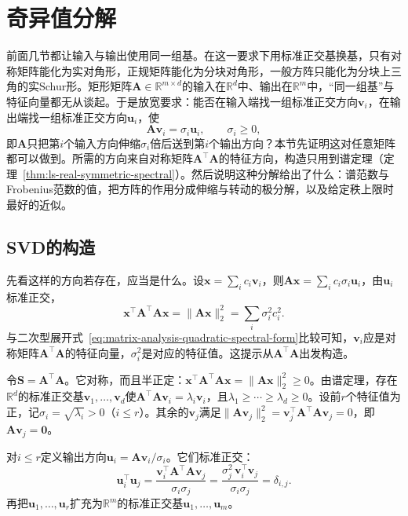 
\section{奇异值分解}
\label{sec:ls-svd}

前面几节都让输入与输出使用同一组基。在这一要求下用标准正交基换基，只有对称矩阵能化为实对角形，正规矩阵能化为分块对角形，一般方阵只能化为分块上三角的实Schur形。矩形矩阵$\bm A\in\mathbb R^{m\times d}$的输入在$\mathbb R^d$中、输出在$\mathbb R^m$中，“同一组基”与特征向量都无从谈起。于是放宽要求：能否在输入端找一组标准正交方向$\bm v_i$，在输出端找一组标准正交方向$\bm u_i$，使
\[
 \bm A\bm v_i=\sigma_i\bm u_i ,\qquad \sigma_i\geq0,
\]
即$\bm A$只把第$i$个输入方向伸缩$\sigma_i$倍后送到第$i$个输出方向？本节先证明这对任意矩阵都可以做到。所需的方向来自对称矩阵$\bm A^\top\bm A$的特征方向，构造只用到谱定理（定理~\ref{thm:ls-real-symmetric-spectral}）。然后说明这种分解给出了什么：谱范数与Frobenius范数的值，把方阵的作用分成伸缩与转动的极分解，以及给定秩上限时最好的近似。

\subsection{SVD的构造}

先看这样的方向若存在，应当是什么。设$\bm x=\sum_ic_i\bm v_i$，则$\bm A\bm x=\sum_ic_i\sigma_i\bm u_i$，由$\bm u_i$标准正交，
\[
 \bm x^\top\bm A^\top\bm A\bm x=\lVert\bm A\bm x\rVert_2^2=\sum_i\sigma_i^2c_i^2 .
\]
与二次型展开式~\eqref{eq:matrix-analysis-quadratic-spectral-form}比较可知，$\bm v_i$应是对称矩阵$\bm A^\top\bm A$的特征向量，$\sigma_i^2$是对应的特征值。这提示从$\bm A^\top\bm A$出发构造。

令$\bm S=\bm A^\top\bm A$。它对称，而且半正定：$\bm x^\top\bm A^\top\bm A\bm x=\lVert\bm A\bm x\rVert_2^2\geq0$。由谱定理，存在$\mathbb R^d$的标准正交基$\bm v_1,\ldots,\bm v_d$使$\bm A^\top\bm A\bm v_i=\lambda_i\bm v_i$，且$\lambda_1\geq\cdots\geq\lambda_d\geq0$。设前$r$个特征值为正，记$\sigma_i=\sqrt{\lambda_i}>0$（$i\leq r$）。其余的$\bm v_j$满足$\lVert\bm A\bm v_j\rVert_2^2=\bm v_j^\top\bm A^\top\bm A\bm v_j=0$，即$\bm A\bm v_j=\bm0$。

对$i\leq r$定义输出方向$\bm u_i=\bm A\bm v_i/\sigma_i$。它们标准正交：
\[
 \bm u_i^\top\bm u_j
 =\frac{\bm v_i^\top\bm A^\top\bm A\bm v_j}{\sigma_i\sigma_j}
 =\frac{\sigma_j^2\,\bm v_i^\top\bm v_j}{\sigma_i\sigma_j}=\delta_{i,j}.
\]
再把$\bm u_1,\dots,\bm u_r$扩充为$\mathbb R^m$的标准正交基$\bm u_1,\ldots,\bm u_m$。

